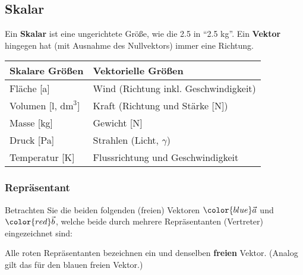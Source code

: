 \subsection{Skalar}
Ein \textbf{Skalar} ist eine ungerichtete Größe, wie \zB die 2.5 in
``2.5 kg''.
Ein \textbf{Vektor} hingegen hat (mit Ausnahme des Nullvektors) immer
eine Richtung.

\begin{tabular}{ll}\hline
  Skalare Größen& Vektorielle Größen\\\hline

  Fläche [a]                   & Wind (Richtung inkl. Geschwindigkeit)\\
  Volumen [l, $\text{dm}^3$] & Kraft (Richtung und Stärke [N])\\
  Masse [kg]                   & Gewicht [N]\\
  Druck [Pa]                   & Strahlen (Licht, $\gamma$)\\
  Temperatur [K]               & Flussrichtung und Geschwindigkeit
\end{tabular}
\newpage




\subsubsection{Repräsentant}
Betrachten Sie die beiden folgenden (freien) Vektoren ${\color{blue} \vec{a}}$ und
${\color{red}\vec{b}}$, welche beide durch mehrere Repräsentanten
(Vertreter) eingezeichnet sind:


Alle {\color{red} roten} Repräsentanten bezeichnen ein und denselben
\textbf{freien} Vektor. (Analog gilt das für den {\color{blue} blauen} freien Vektor.)

